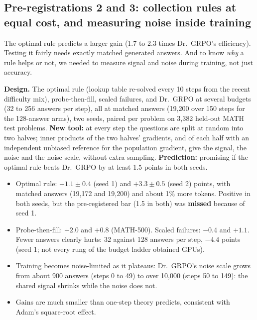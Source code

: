 \documentclass[11pt]{article}
\begin{document}
\subsection{Pre-registrations 2 and 3: collection rules at equal cost, and measuring noise inside training}
\begin{why}
The optimal rule predicts a larger gain (1.7 to 2.3 times Dr.\ GRPO's efficiency). Testing it fairly needs exactly matched generated answers. And to know \emph{why} a rule helps or not, we needed to measure signal and noise during training, not just accuracy.
\end{why}
\textbf{Design.} The optimal rule (lookup table re-solved every 10 steps from the recent difficulty mix), probe-then-fill, scaled failures, and Dr.\ GRPO at several budgets (32 to 256 answers per step), all at matched answers (19,200 over 150 steps for the 128-answer arms), two seeds, paired per problem on 3,382 held-out MATH test problems. \textbf{New tool:} at every step the questions are split at random into two halves; inner products of the two halves' gradients, and of each half with an independent unbiased reference for the population gradient, give the signal, the noise and the noise scale, without extra sampling. \textbf{Prediction:} promising if the optimal rule beats Dr.\ GRPO by at least 1.5 points in both seeds.
\begin{found}
\begin{itemize}[leftmargin=*,itemsep=1pt]
\item Optimal rule: $+1.1\pm0.4$ (seed 1) and $+3.3\pm0.5$ (seed 2) points, with matched answers (19,172 and 19,200) and about 1\% more tokens. Positive in both seeds, but the pre-registered bar (1.5 in both) was \textbf{missed} because of seed 1.
\item Probe-then-fill: $+2.0$ and $+0.8$ (MATH-500). Scaled failures: $-0.4$ and $+1.1$. Fewer answers clearly hurts: 32 against 128 answers per step, $-4.4$ points (seed 1; not every rung of the budget ladder obtained GPUs).
\item Training becomes noise-limited as it plateaus: Dr.\ GRPO's noise scale grows from about 900 answers (steps 0 to 49) to over 10,000 (steps 50 to 149): the shared signal shrinks while the noise does not.
\item Gains are much smaller than one-step theory predicts, consistent with Adam's square-root effect.
\end{itemize}
\end{found}

\end{document}
